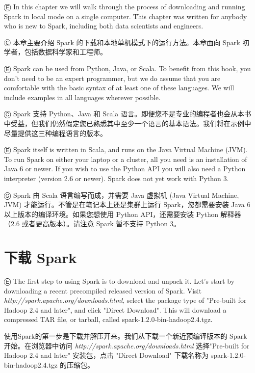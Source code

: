 


Ⓔ \textcolor{etc}{In this chapter we will walk through the process of downloading and running Spark in local mode on a single computer. This chapter was written for anybody who is new to Spark, including both data scientists and engineers.}

Ⓒ 本章主要介绍 Spark 的下载和本地单机模式下的运行方法。本章面向 Spark
初学者，包括数据科学家和工程师。

Ⓔ \textcolor{etc}{Spark can be used from Python, Java, or Scala. To benefit from this book, you don't need to be an expert programmer, but we do assume that you are comfortable with the basic syntax of at least one of these languages. We will include examples in all languages wherever possible.}

Ⓒ Spark 支持 Python、Java 和 Scala
语言。即便您不是专业的编程者也会从本书中受益，但我们仍然假定您已熟悉其中至少一个语言的基本语法。我们将在示例中尽量提供这三种编程语言的版本。

Ⓔ \textcolor{etc}{Spark itself is written in Scala, and runs on the Java Virtual Machine (JVM). To run Spark on either your laptop or a cluster, all you need is an installation of Java 6 or newer. If you wish to use the Python API you will also need a Python interpreter (version 2.6 or newer). Spark does not yet work with Python 3.}

Ⓒ Spark 由 Scala 语言编写而成，并需要 Java 虚拟机 (Java Virtual Machine,
JVM) 才能运行。不管是在笔记本上还是集群上运行 Spark，您都需要安装 Java 6
以上版本的编译环境。如果您想使用 Python API，还需要安装 Python
解释器（2.6 或者更高版本）。请注意 Spark 暂不支持 Python 3。


%
\section{下载 Spark}\label{download-spark}

Ⓔ \textcolor{etc}{The first step to using Spark is to download and unpack it. Let's start by downloading a recent precompiled released version of Spark. Visit \emph{http://spark.apache.org/downloads.html}, select the package type of "Pre-built for Hadoop 2.4 and later", and click "Direct Download". This will download a compressed TAR file, or tarball, called spark-1.2.0-bin-hadoop2.4.tgz. }

使用Spark的第一步是下载并解压开来。我们从下载一个新近预编译版本的 Spark
开始。在浏览器中访问 \emph{http://spark.apache.org/downloads.html}
选择"Pre-built for Hadoop 2.4 and later" 安装包，点击 "Direct
Download" 下载名称为 spark-1.2.0-bin-hadoop2.4.tgz 的压缩包。

